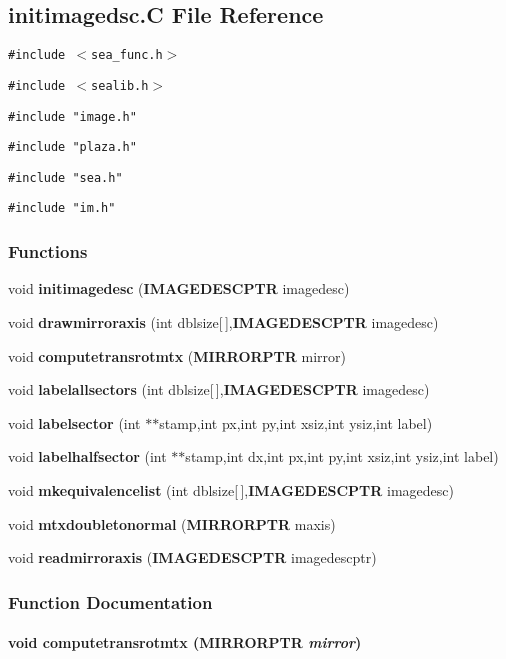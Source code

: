 \subsection{initimagedsc.C File Reference}
\label{initimagedsc.C}
{\tt \#include $<$sea\_\-func.h$>$}\par
{\tt \#include $<$sealib.h$>$}\par
{\tt \#include "image.h"}\par
{\tt \#include "plaza.h"}\par
{\tt \#include "sea.h"}\par
{\tt \#include "im.h"}\par
\subsubsection*{Functions}
\begin{CompactItemize}
\item 
void {\bf initimagedesc} ({\bf IMAGEDESCPTR} imagedesc)
\item 
void {\bf drawmirroraxis} (int dblsize[$\,$],{\bf IMAGEDESCPTR} imagedesc)
\item 
void {\bf computetransrotmtx} ({\bf MIRRORPTR} mirror)
\item 
void {\bf labelallsectors} (int dblsize[$\,$],{\bf IMAGEDESCPTR} imagedesc)
\item 
void {\bf labelsector} (int $\ast$$\ast$stamp,int px,int py,int xsiz,int ysiz,int label)
\item 
void {\bf labelhalfsector} (int $\ast$$\ast$stamp,int dx,int px,int py,int xsiz,int ysiz,int label)
\item 
void {\bf mkequivalencelist} (int dblsize[$\,$],{\bf IMAGEDESCPTR} imagedesc)
\item 
void {\bf mtxdoubletonormal} ({\bf MIRRORPTR} maxis)
\item 
void {\bf readmirroraxis} ({\bf IMAGEDESCPTR} imagedescptr)
\end{CompactItemize}


\subsubsection{Function Documentation}
\label{initimagedsc.C_a2}
\paragraph{\setlength{\rightskip}{0pt plus 5cm}void computetransrotmtx ({\bf MIRRORPTR} {\em mirror})}\hfill



